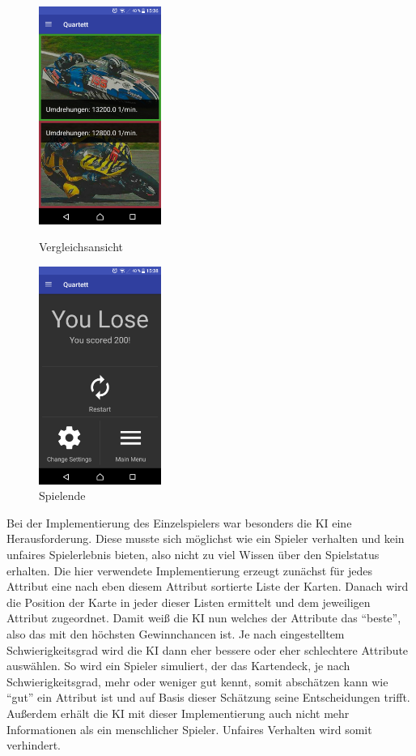 \documentclass{scrartcl}
\begin{document}
\begin{figure}[!ht]
  \centering
  \begin{minipage}{0.45\textwidth}
    \centering
    \includegraphics[width=4cm]{img/game_compare.png}
    \caption{Vergleichsansicht}
  \end{minipage}
  \hfill
  \begin{minipage}{0.45\textwidth}
    \centering
    \includegraphics[width=4cm]{img/game_end.png}
    \caption{Spielende}
  \end{minipage}
\end{figure}

\noindent
Bei der Implementierung des Einzelspielers war besonders die KI eine
Herausforderung. Diese musste sich möglichst wie ein Spieler verhalten und kein
unfaires Spielerlebnis bieten, also nicht zu viel Wissen über den Spielstatus
erhalten. Die hier verwendete Implementierung erzeugt zunächst für jedes
Attribut eine nach eben diesem Attribut sortierte Liste der Karten. Danach wird
die Position der Karte in jeder dieser Listen ermittelt und dem jeweiligen
Attribut zugeordnet. Damit weiß die KI nun welches der Attribute das
\enquote{beste}, also das mit den höchsten Gewinnchancen ist. Je nach
eingestelltem Schwierigkeitsgrad wird die KI dann eher bessere oder eher
schlechtere Attribute auswählen. So wird ein Spieler simuliert, der das
Kartendeck, je nach Schwierigkeitsgrad, mehr oder weniger gut kennt, somit
abschätzen kann wie \enquote{gut} ein Attribut ist und auf Basis dieser
Schätzung seine Entscheidungen trifft. Außerdem erhält die KI mit dieser
Implementierung auch nicht mehr Informationen als ein menschlicher Spieler.
Unfaires Verhalten wird somit verhindert.
\end{document}

